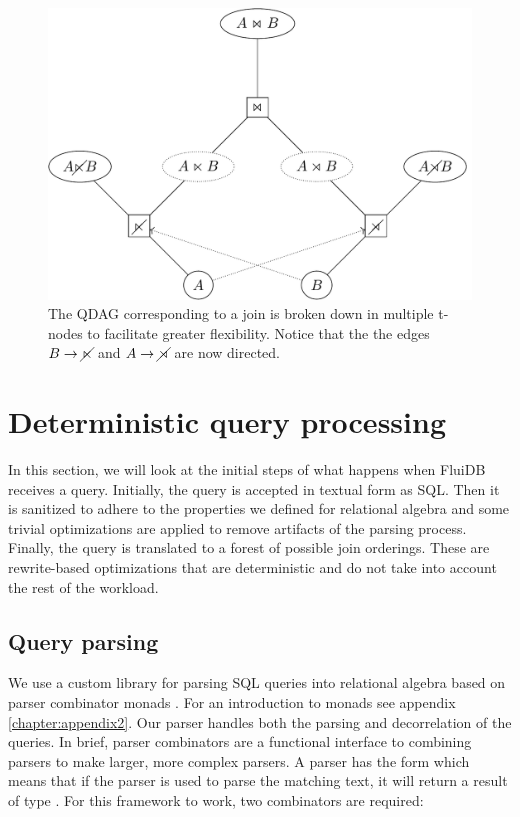 \begin{figure}[H]
  \centering
  \includegraphics[width=.9\linewidth]{./imgs/joinnetdir.pdf}
  \caption{\label{fig:joinnetdir}The QDAG corresponding to a join is
    broken down in multiple t-nodes to facilitate greater
    flexibility. Notice that the the edges \(B \to \cancel\ltimes\) and \(A \to \cancel\rtimes\) are now directed.}
\end{figure}

\section{Deterministic query processing}
\label{sec:query_processing}

In this section, we will look at the initial steps of what happens
when FluiDB receives a query. Initially, the query is accepted in
textual form as SQL. Then it is sanitized to adhere to the properties
we defined for relational algebra and some trivial optimizations are
applied to remove artifacts of the parsing process. Finally, the query
is translated to a forest of possible join orderings. These are
rewrite-based optimizations that are deterministic and do not take
into account the rest of the workload.

\subsection{Query parsing}
\label{sec:query_parsing}

We use a custom library for parsing SQL queries into relational
algebra based on parser combinator monads
\cite{leijenParsecDirectStyle}. For an introduction to monads see appendix \ref{chapter:appendix2}.
Our parser handles both the parsing
and decorrelation of the queries. In brief, parser combinators are a
functional interface to combining parsers to make larger, more complex parsers. A
parser  has the form  which means that if the parser
is used to parse the matching text, it will return a result of type
. For this framework to work, two combinators are required:

